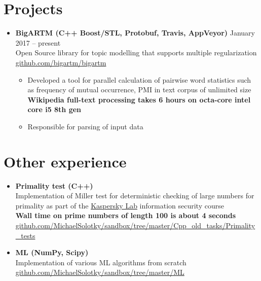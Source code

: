 \documentclass[letterpaper,11pt]{article}
\newcommand{\resumeSubHeadingListStart}{\begin{itemize}[leftmargin=*]}
\newcommand{\resumeSubHeadingListEnd}{\end{itemize}}
\begin{document}
\section{Projects}
\resumeSubHeadingListStart
    \item{
      \textbf{{BigARTM}{ (C++ Boost/STL, Protobuf, Travis, AppVeyor)}}
      \hfill
      January 2017 -- present
    } \\
    Open Source library for topic modelling that supports multiple regularization \\
    \faGithub \enspace \href{https://github.com/bigartm/bigartm}{\color{blue} github.com/bigartm/bigartm}
    \vspace{-6pt}    
    \begin{itemize}
      \item Developed a tool for parallel calculation of pairwise word statistics such as frequency of mutual occurrence, PMI in text corpus of unlimited size \\
      \textbf{Wikipedia full-text processing takes 6 hours on octa-core intel core i5 8th gen}
      \vspace{-2pt}      
      \item Responsible for parsing of input data
    \end{itemize}

  \resumeSubHeadingListEnd

\vspace{-19pt}
\section{Other experience}
  \resumeSubHeadingListStart
      \item{
        \textbf{{Primality test}{ (C++) }} \\
        Implementation of Miller test for deterministic checking of large numbers for primality as part of the \href{https://www.kaspersky.com/}{\color{blue} Kaspersky Lab} information security course \\
        \textbf{Wall time on prime numbers of length 100 is about 4 seconds} \\
        \faGithub \enspace \href{https://github.com/MichaelSolotky/sandbox/tree/master/Cpp_old_tasks/Primality_tests}{\color{blue} github.com/MichaelSolotky/sandbox/tree/master/Cpp\_old\_tasks/Primality\_tests}
      }
	  \vspace{-6pt}
      \item{
        \textbf{ML (NumPy, Scipy)} \\
        Implementation of various ML algorithms from scratch \\
        \faGithub \enspace \href{https://github.com/MichaelSolotky/sandbox/tree/master/ML}{\color{blue} github.com/MichaelSolotky/sandbox/tree/master/ML}
      }
      \resumeSubHeadingListEnd
\end{document}
